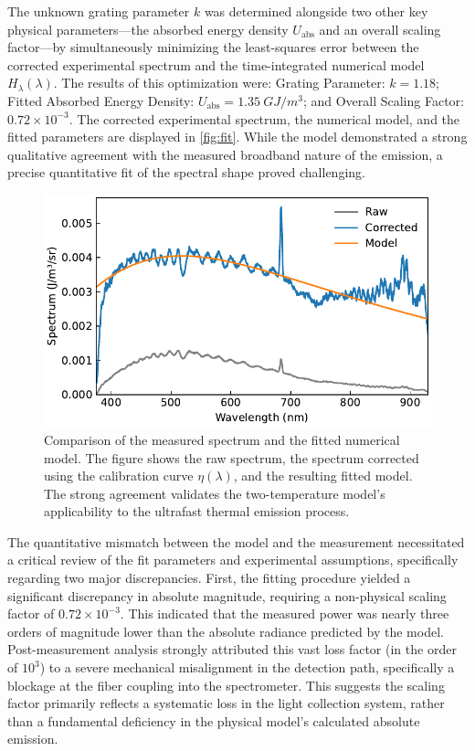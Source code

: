\documentclass[
	a4paper,
]{scrarticle}
\begin{document}
The unknown grating parameter $k$ was determined alongside two other key physical parameters—the absorbed energy density $U_{\text{abs}}$ and an overall scaling factor—by simultaneously minimizing the least-squares error between the corrected experimental spectrum and the time-integrated numerical model $H_\lambda(\lambda)$. The results of this optimization were: Grating Parameter: $k=1.18$; Fitted Absorbed Energy Density: $U_{\text{abs}} = \SI{1.35}{GJ/m^3}$; and Overall Scaling Factor: $0.72 \times 10^{-3}$. The corrected experimental spectrum, the numerical model, and the fitted parameters are displayed in \autoref{fig:fit}. While the model demonstrated a strong qualitative agreement with the measured broadband nature of the emission, a precise quantitative fit of the spectral shape proved challenging.

\begin{figure}[h]
    \centering
    \includegraphics{../analysis/figures/combined.fit.pdf}
    \caption{Comparison of the measured spectrum and the fitted numerical model. The figure shows the raw spectrum, the spectrum corrected using the calibration curve $\eta(\lambda)$, and the resulting fitted model. The strong agreement validates the two-temperature model's applicability to the ultrafast thermal emission process.}
    \label{fig:fit}
\end{figure}

The quantitative mismatch between the model and the measurement necessitated a critical review of the fit parameters and experimental assumptions, specifically regarding two major discrepancies. First, the fitting procedure yielded a significant discrepancy in absolute magnitude, requiring a non-physical scaling factor of $0.72 \times 10^{-3}$. This indicated that the measured power was nearly three orders of magnitude lower than the absolute radiance predicted by the model. Post-measurement analysis strongly attributed this vast loss factor (in the order of $10^3$) to a severe mechanical misalignment in the detection path, specifically a blockage at the fiber coupling into the spectrometer. This suggests the scaling factor primarily reflects a systematic loss in the light collection system, rather than a fundamental deficiency in the physical model's calculated absolute emission.
\end{document}
